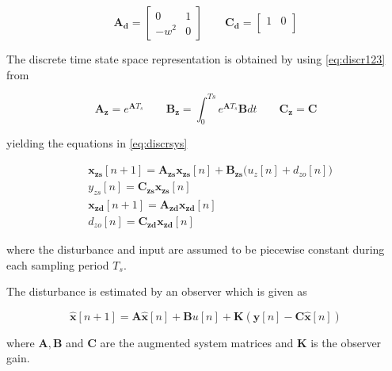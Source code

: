 \begin{equation}
  \label{eq:sinm}
  \mathbf{A_d} =
    \begin{bmatrix}
       0 & 1\\[0.3em]
       -w^2 & 0
     \end{bmatrix}
     \qquad
  \mathbf{C_d} =
    \begin{bmatrix}
        1 & 0\\
    \end{bmatrix}
\end{equation}

The discrete time state space representation is obtained by using \eqref{eq:discr123} from \citep{industrial}

\begin{equation}
  \label{eq:discr123}
  \mathbf{A_z} = e^{\mathbf{A}T_s}  \qquad \mathbf{B_z} = \int_{0}^{Ts} e^{\mathbf{A}T_s}\mathbf{B} dt \qquad \mathbf{C_z} = \mathbf{C}
\end{equation}

yielding the equations in \eqref{eq:discrsys}

\begin{subequations}
  \label{eq:discrsys}
  \begin{alignat}{2}
    & \mathbf{x_{zs}}[n + 1] = \mathbf{A_{zs}x_{zs}}[n] + \mathbf{B_{zs}} \big( u_z[n] + d_{zo}[n] \big)\\
    & y_{zs}[n] = \mathbf{C_{zs}x_{zs}}[n] \\
    & \mathbf{x_{zd}}[n + 1] = \mathbf{A_{zd}x_{zd}}[n]\\
    & d_{zo}[n] = \mathbf{C_{zd}x_{zd}}[n]
  \end{alignat}
\end{subequations}

where the disturbance and input are assumed to be piecewise constant during each sampling period $T_s$.

The disturbance is estimated by an observer which is given as

\begin{equation}
  \label{eq:obs}
  \mathbf{\hat{x}}[n + 1] = \mathbf{A\hat{x}}[n] + \mathbf{B}u[n] + \mathbf{K}(\mathbf{y}[n] - \mathbf{C\hat{x}}[n])
\end{equation}

where $\mathbf{A, B}$ and $\mathbf{C}$ are the augmented system matrices and $\mathbf{K}$ is the observer gain.

